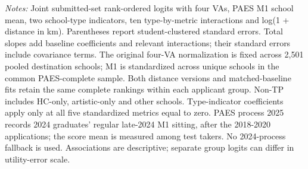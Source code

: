\begin{table}[!htbp]
{\begin{tabular}{lcccc}
\bottomrule
\end{tabular}
}
\par\smallskip
\begin{minipage}{0.98\linewidth}\footnotesize
\textit{Notes:} Joint submitted-set rank-ordered logits with four VAs, PAES M1 school mean, two school-type indicators, ten type-by-metric interactions and log(1 + distance in km). Parentheses report student-clustered standard errors. Total slopes add baseline coefficients and relevant interactions; their standard errors include covariance terms. The original four-VA normalization is fixed across 2,501 pooled destination schools; M1 is standardized across unique schools in the common PAES-complete sample. Both distance versions and matched-baseline fits retain the same complete rankings within each applicant group. Non-TP includes HC-only, artistic-only and other schools. Type-indicator coefficients apply only at all five standardized metrics equal to zero. PAES process 2025 records 2024 graduates' regular late-2024 M1 sitting, after the 2018-2020 applications; the score mean is measured among test takers. No 2024-process fallback is used. Associations are descriptive; separate group logits can differ in utility-error scale.
\end{minipage}
\end{table}
